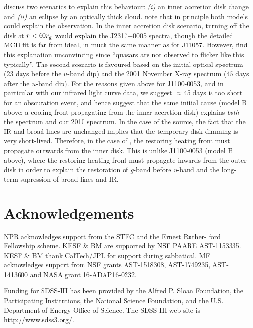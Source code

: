 \documentclass[11pt,a4paper]{article}
\begin{document}
\citet{Guo2016} discuss two scenarios to explain this behaviour: {\it
(i)} an inner accretion disk change and {\it (ii)} an eclipse by an
optically thick cloud. \citet{Guo2016} note that in principle both
models could explain the observation. In the inner accretion disk
scenario, turning off the disk at $r < 60 r_{\rm g}$ would explain the
J2317+0005 spectra, though the detailed MCD fit is far from ideal, in
much the same manner as for J11057. However, \citet{Guo2016} find this
explanation unconvincing since ``quasars are not observed to flicker
like this typically''.  The second scenario is favoured based on the
initial optical spectrum (23 days before the $u$-band dip) and the
2001 November X-ray spectrum (45 days after the $u$-band dip).  For
the reasons given above for J1100-0053, and in particular with our
infrared light curve data, we suggest $\approx$45 days is too short
for an obscuration event, and hence suggest that the same initial
cause (model B above: a cooling front propagating from the inner
accretion disk) explains \emph{both} the \citet{Guo2016} spectrum and
our 2010 spectrum. In the case of the \citet{Guo2016} source, the fact
that the IR and broad lines are unchanged implies that the temporary
disk dimming is very short-lived. Therefore, in the case of
\citet{Guo2016}, the restoring heating front must propagate outwards
from the inner disk. This is unlike J1100-0053 (model B above), where the
restoring heating front must propagate inwards from the outer disk in
order to explain the restoration of {\it g}-band before {\it u}-band
and the long-term supression of broad lines and IR.


\section*{Acknowledgements}
NPR acknowledges support from the STFC and the Ernest Ruther- ford
Fellowship scheme.  KESF \& BM are supported by NSF PAARE
AST-1153335. KESF \& BM thank CalTech/JPL for support during
sabbatical.  MF acknowledges support from NSF grants AST-1518308,
AST-1749235, AST-1413600 and NASA grant 16-ADAP16-0232.

Funding for SDSS-III has been provided by the Alfred P. Sloan
Foundation, the Participating Institutions, the National Science
Foundation, and the U.S. Department of Energy Office of Science. The
SDSS-III web site is
\href{http://www.sdss3.org/}{http://www.sdss3.org/}.
\end{document}
